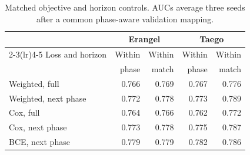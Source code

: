 \begin{table}[t]
\centering\footnotesize
\caption{Matched objective and horizon controls. AUCs average three seeds after a common phase-aware validation mapping.}
\label{tab:objective}
\setlength{\tabcolsep}{3pt}
\begin{tabular}{lrrrr}
\toprule
 & \multicolumn{2}{c}{Erangel} & \multicolumn{2}{c}{Taego} \\
\cmidrule(lr){2-3}\cmidrule(lr){4-5}
Loss and horizon & Within & Within & Within & Within \\
 & phase & match & phase & match \\
\midrule
Weighted, full & 0.766 & 0.769 & 0.767 & 0.776 \\
Weighted, next phase & 0.772 & 0.778 & 0.773 & 0.789 \\
Cox, full & 0.764 & 0.766 & 0.762 & 0.772 \\
Cox, next phase & 0.773 & 0.778 & 0.775 & 0.787 \\
BCE, next phase & 0.779 & 0.779 & 0.782 & 0.786 \\
\bottomrule
\end{tabular}
\end{table}
